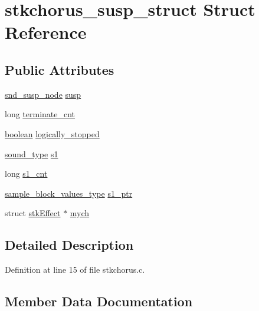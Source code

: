 \hypertarget{structstkchorus__susp__struct}{}\section{stkchorus\+\_\+susp\+\_\+struct Struct Reference}
\label{structstkchorus__susp__struct}
\subsection*{Public Attributes}
\begin{DoxyCompactItemize}
\item 
\hyperlink{sound_8h_a6b268203688a934bd798ceb55f85d4c0}{snd\+\_\+susp\+\_\+node} \hyperlink{structstkchorus__susp__struct_adc39b0774fd6fc0e00fffd6af7d7840b}{susp}
\item 
long \hyperlink{structstkchorus__susp__struct_ab6597d621345ca24477fc9b94aed4b25}{terminate\+\_\+cnt}
\item 
\hyperlink{cext_8h_a7670a4e8a07d9ebb00411948b0bbf86d}{boolean} \hyperlink{structstkchorus__susp__struct_a0c0768ec2fa080f81cec92febde967b6}{logically\+\_\+stopped}
\item 
\hyperlink{sound_8h_a792cec4ed9d6d636d342d9365ba265ea}{sound\+\_\+type} \hyperlink{structstkchorus__susp__struct_ac74d095a4a94b1277826782e9185a1a5}{s1}
\item 
long \hyperlink{structstkchorus__susp__struct_a66f88779ec90e710a39a07674fa96e96}{s1\+\_\+cnt}
\item 
\hyperlink{sound_8h_a83d17f7b465d1591f27cd28fc5eb8a03}{sample\+\_\+block\+\_\+values\+\_\+type} \hyperlink{structstkchorus__susp__struct_a871f250e3263e7ffca9784d072294972}{s1\+\_\+ptr}
\item 
struct \hyperlink{structstk_effect}{stk\+Effect} $\ast$ \hyperlink{structstkchorus__susp__struct_a7f91686837ebebcd05085a6684ef8a66}{mych}
\end{DoxyCompactItemize}


\subsection{Detailed Description}


Definition at line 15 of file stkchorus.\+c.



\subsection{Member Data Documentation}

